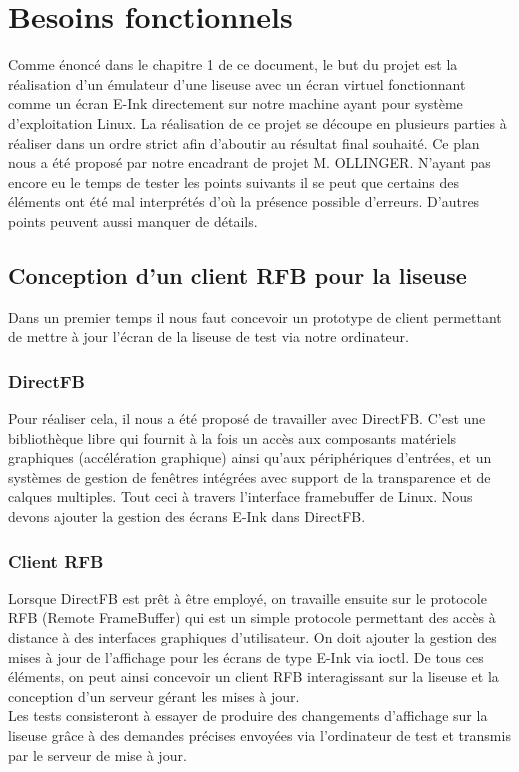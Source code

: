 \chapter{Besoins fonctionnels}

Comme énoncé dans le chapitre 1 de ce document, le but du projet est la réalisation d'un émulateur d'une liseuse avec un écran virtuel fonctionnant comme un écran E-Ink directement sur notre machine ayant pour système d'exploitation Linux. La réalisation de ce projet se découpe en plusieurs parties à réaliser dans un ordre strict afin d'aboutir au résultat final souhaité. Ce plan nous a été proposé par notre encadrant de projet M. OLLINGER. N'ayant pas encore eu le temps de tester les points suivants il se peut que certains des éléments ont été mal interprétés d'où la présence possible d'erreurs. D'autres points peuvent aussi manquer de détails.

\section{Conception d'un client RFB pour la liseuse}

Dans un premier temps il nous faut concevoir un prototype de client permettant de mettre à jour l'écran de la liseuse de test via notre ordinateur.

\subsection{DirectFB}
Pour réaliser cela, il nous a été proposé de travailler avec DirectFB. C'est une bibliothèque libre qui fournit à la fois un accès aux composants matériels graphiques (accélération graphique) ainsi qu'aux périphériques d'entrées, et un systèmes de gestion de fenêtres intégrées avec support de la transparence et de calques multiples. Tout ceci à travers l'interface framebuffer de Linux. Nous devons ajouter la gestion des écrans E-Ink dans DirectFB. 
 
\subsection{Client RFB}
Lorsque DirectFB est prêt à être employé, on travaille ensuite sur le protocole RFB (Remote FrameBuffer) qui est un simple protocole permettant des accès à distance à des interfaces graphiques d'utilisateur. On doit ajouter la gestion des mises à jour de l'affichage pour les écrans de type E-Ink via ioctl. De tous ces éléments, on peut ainsi concevoir un client RFB interagissant sur la liseuse et la conception d'un serveur gérant les mises à jour.
\\Les tests consisteront à essayer de produire des changements d'affichage sur la liseuse grâce à des demandes précises envoyées via l'ordinateur de test et transmis par le serveur de mise à jour. 

